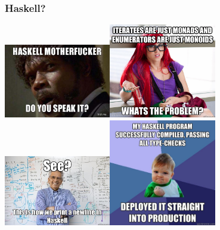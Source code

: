 \documentclass[12pt,compress,english,utf8,t]{beamer}
\begin{document}
\begin{frame}\frametitle{Haskell?}
  \begin{center}
    \vbox{\includegraphics[width=0.35\textwidth]{images/haskell-meme-2.jpeg}\includegraphics[width=0.35\textwidth]{images/haskell-meme-4.jpeg}\\
    \includegraphics[width=0.35\textwidth]{images/haskell-meme-5.jpeg}\includegraphics[width=0.35\textwidth]{images/haskell-meme-6.jpeg}}
  \end{center}
\end{frame}
\end{document}
